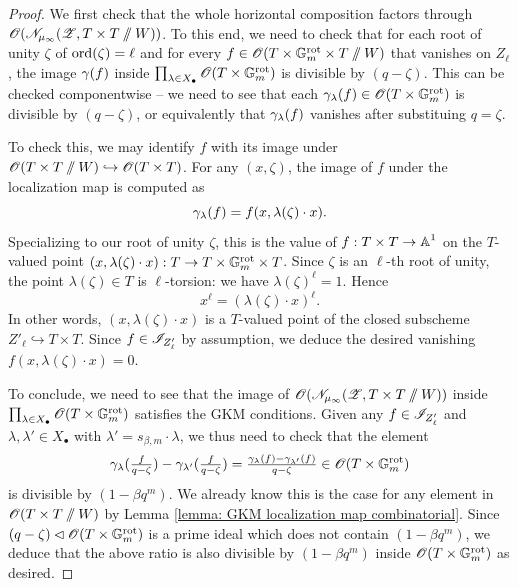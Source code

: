 \begin{proof}
We first check that the whole horizontal composition factors through $\operatorname{\mathscr{O}}(\mathscr{N}_{\mu_{\infty}}(\operatorname{\mathscr{Z}}, T \times T \sslash W))$.
To this end, we need to check that for each root of unity $\zeta$ of $\mathrm{ord}(\zeta) = \ell$ and for every $f \in \operatorname{\mathscr{O}}(T \times \mathbb{G}_m^{\mathrm{rot}} \times T \sslash W)$ that vanishes on $Z_{\ell}$, the image $\gamma(f)$ inside $\prod_{\lambda \in X_{\bullet}} \operatorname{\mathscr{O}}(T \times \mathbb{G}_m^{\mathrm{rot}})$ is divisible by $(q -\zeta)$.
%
This can be checked componentwise -- we need to see that each $\gamma_{\lambda}(f) \in \operatorname{\mathscr{O}}(T \times \mathbb{G}_m^{\mathrm{rot}})$ is divisible by $(q-\zeta)$, or equivalently that $\gamma_{\lambda}(f)$ vanishes after substituing $q=\zeta$. 


To check this, we may identify $f$ with its image under $\operatorname{\mathscr{O}}(T \times T\sslash W) \hookrightarrow \operatorname{\mathscr{O}}(T \times T)$. For any $(x, \zeta)$, the image of $f$ under the localization map is computed as
\begin{equation*}
\gamma_{\lambda}(f) = f(x, \lambda(\zeta) \cdot x).  
\end{equation*}
Specializing to our root of unity $\zeta$, this is the value of $f: T \times T \to \operatorname{\mathbb{A}}^1$ on the $T$-valued point $(x, \lambda(\zeta) \cdot x): T \to T \times \mathbb{G}_m^{\mathrm{rot}} \times T$. Since $\zeta$ is an $\ell$-th root of unity, the point $\lambda(\zeta) \in T$ is $\ell$-torsion: we have $\lambda(\zeta)^{\ell} = 1$.
Hence
\begin{equation*}
    x^{\ell} = (\lambda(\zeta)\cdot x)^{\ell}.
\end{equation*}
In other words, $(x, \lambda(\zeta) \cdot x)$ is a $T$-valued point of the closed subscheme $Z'_{\ell} \hookrightarrow T \times T$. Since $f \in \mathscr{I}_{Z'_{\ell}}$ by assumption, we deduce the desired vanishing $f(x, \lambda(\zeta) \cdot x) = 0$.

To conclude, we need to see that the image of $\operatorname{\mathscr{O}}(\mathscr{N}_{\mu_{\infty}}(\operatorname{\mathscr{Z}}, T \times T \sslash W))$ inside $\prod_{\lambda \in X_{\bullet}} \operatorname{\mathscr{O}}(T \times \mathbb{G}_m^{\mathrm{rot}})$ satisfies the GKM conditions. Given any $f \in \mathscr{I}_{Z_{\ell}'}$ and $\lambda, \lambda' \in X_{\bullet}$ with $ \lambda' = s_{\beta, m}\cdot \lambda$, we thus need to check that the element
\begin{equation*}
\gamma_{\lambda}(\tfrac{f}{q - \zeta}) - \gamma_{\lambda'}(\tfrac{f}{q - \zeta})
= \tfrac{\gamma_{\lambda}(f) - \gamma_{\lambda'}(f)}{q - \zeta} \in \operatorname{\mathscr{O}}(T \times \mathbb{G}_m^{\mathrm{rot}})
\end{equation*}
is divisible by $(1 - \beta q^m)$.
We already know this is the case for any element in $\operatorname{\mathscr{O}}(T \times T \sslash W)$ by Lemma \ref{lemma: GKM localization map combinatorial}. Since $(q - \zeta) \lhd \operatorname{\mathscr{O}}(T \times \mathbb{G}_m^{\mathrm{rot}})$ is a prime ideal which does not contain $(1-\beta q^m)$, we deduce that the above ratio is also divisible by $(1 - \beta q^m)$ inside $\operatorname{\mathscr{O}}(T \times \mathbb{G}_m^{\mathrm{rot}})$ as desired.
\end{proof}

